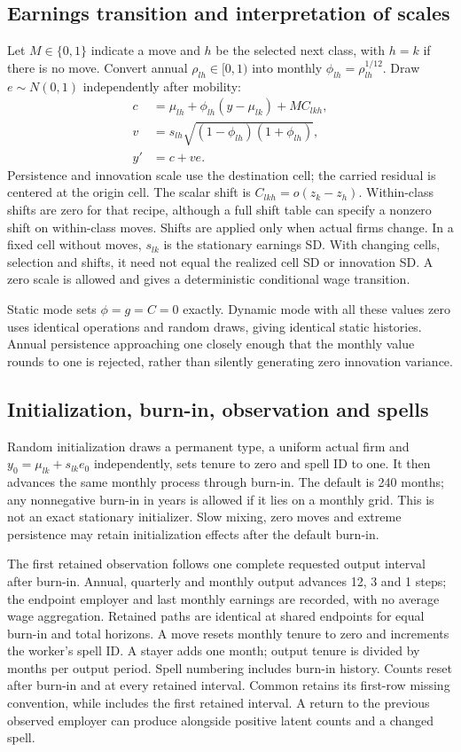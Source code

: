\documentclass[11pt,letterpaper]{article}
\newcommand{\code}[1]{\texttt{\detokenize{#1}}}
\begin{document}
\subsection{Earnings transition and interpretation of scales}
Let $M\in\{0,1\}$ indicate a move and $h$ be the selected next class, with
$h=k$ if there is no move. Convert annual $\rho_{lh}\in[0,1)$ into monthly
$\phi_{lh}=\rho_{lh}^{1/12}$. Draw $e\sim N(0,1)$ independently after mobility:
\begin{align}
 c &= \mu_{lh}+\phi_{lh}(y-\mu_{lk})+M C_{lkh},\\
 v &=s_{lh}\sqrt{(1-\phi_{lh})(1+\phi_{lh})},\\
 y'&=c+ve.
\label{eq:blmwage}
\end{align}
Persistence and innovation scale use the destination cell; the carried residual
is centered at the origin cell. The scalar shift is
$C_{lkh}=o(z_k-z_h)$. Within-class shifts are zero for that recipe, although a
full shift table can specify a nonzero shift on within-class moves. Shifts are
applied only when actual firms change. In a fixed cell without moves,
$s_{lk}$ is the stationary earnings SD. With changing cells, selection and
shifts, it need not equal the realized cell SD or innovation SD. A zero scale
is allowed and gives a deterministic conditional wage transition.

Static mode sets $\phi=g=C=0$ exactly. Dynamic mode with all these values zero
uses identical operations and random draws, giving identical static histories.
Annual persistence approaching one closely enough that the monthly value rounds
to one is rejected, rather than silently generating zero innovation variance.

\subsection{Initialization, burn-in, observation and spells}
Random initialization draws a permanent type, a uniform actual firm and
$y_0=\mu_{lk}+s_{lk}e_0$ independently, sets tenure to zero and spell ID to one.
It then advances the same monthly process through burn-in. The default is
240 months; any nonnegative burn-in in years is allowed if it lies on a monthly
grid. This is not an exact stationary initializer. Slow mixing, zero moves and
extreme persistence may retain initialization effects after the default burn-in.

The first retained observation follows one complete requested output interval
after burn-in. Annual, quarterly and monthly output advances 12, 3 and 1 steps;
the endpoint employer and last monthly earnings are recorded, with no average
wage aggregation. Retained paths are identical at shared endpoints for equal
burn-in and total horizons. A move resets monthly tenure to zero and increments
the worker's spell ID. A stayer adds one month; output tenure is divided by
months per output period. Spell numbering includes burn-in history. Counts reset
after burn-in and at every retained interval. Common \code{ntransitions} retains
its first-row missing convention, while \code{n_ee_true} includes the first
retained interval. A return to the previous observed employer can produce
\code{jobtojob=0} alongside positive latent counts and a changed spell.
\end{document}
